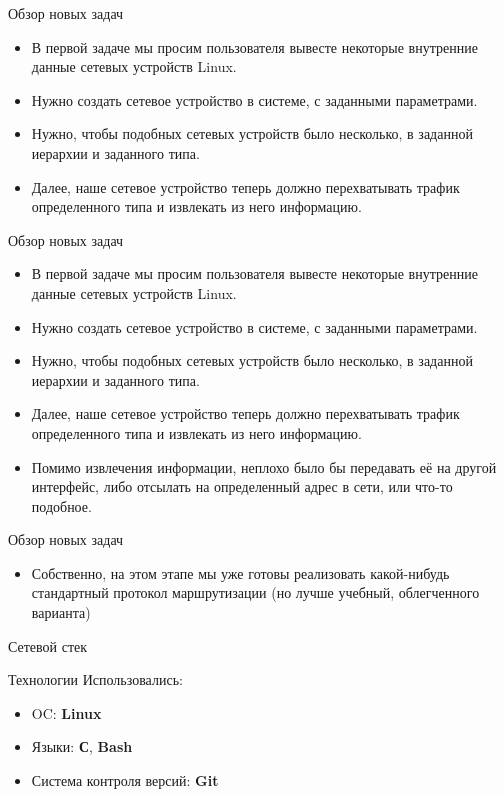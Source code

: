 \documentclass{beamer}
\begin{document}
\begin{frame}{Обзор новых задач}
	\begin{itemize}
		\item В первой задаче мы просим пользователя вывесте некоторые внутренние данные сетевых устройств Linux.
		\item Нужно создать сетевое устройство в системе, с заданными параметрами.
		\item Нужно, чтобы подобных сетевых устройств было несколько, в заданной иерархии и заданного типа.
		\item Далее, наше сетевое устройство теперь должно перехватывать трафик определенного типа и извлекать из него информацию.
	\end{itemize}
\end{frame}

\begin{frame}{Обзор новых задач}
	\begin{itemize}
		\item В первой задаче мы просим пользователя вывесте некоторые внутренние данные сетевых устройств Linux.
		\item Нужно создать сетевое устройство в системе, с заданными параметрами.
		\item Нужно, чтобы подобных сетевых устройств было несколько, в заданной иерархии и заданного типа.
		\item Далее, наше сетевое устройство теперь должно перехватывать трафик определенного типа и извлекать из него информацию.
		\item Помимо извлечения информации, неплохо было бы передавать её на другой интерфейс, либо отсылать на определенный адрес в сети, или что-то подобное.
	\end{itemize}
\end{frame}
\begin{frame}{Обзор новых задач}
	\begin{itemize}
                \item Собственно, на этом этапе мы уже готовы реализовать какой-нибудь стандартный протокол маршрутизации (но лучше учебный, облегченного варианта)
	\end{itemize}
\end{frame}


\begin{frame}{Сетевой стек}
\end{frame}

\begin{frame}{Технологии}
        Использовались:
	\begin{itemize}
		\item OC: \textbf{Linux}
		\item Языки: \textbf{С}, \textbf{Bash}
		\item Система контроля версий: \textbf{Git}
	\end{itemize}
\end{frame}
\end{document}
